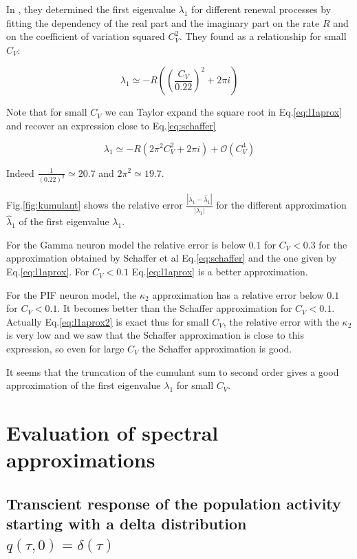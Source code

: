 \documentclass[12pt,twoside]{report}
\begin{document}
In \cite{SchOst13},  they determined the first eigenvalue $\lambda_1$ for different renewal processes by fitting the dependency of the real part and the imaginary part on the rate $R$ and on the coefficient of variation squared $C_V^2$. They found as a relationship for small $C_V$:

\begin{equation}
\label{eq:schaffer}
\lambda_1 \simeq -R\left( \left(\frac{C_V}{0.22}\right)^2+2\pi i\right) 
\end{equation}

Note that for small $C_V$ we can Taylor expand the square root in Eq.\eqref{eq:l1aprox} and recover an expression close to Eq.\eqref{eq:schaffer}

\begin{equation}
\label{eq:l1aprox2}
\lambda_1\simeq -R\left(2\pi^2 C_V^2+2\pi i\right) + \mathcal{O}(C_V^4)
\end{equation}

Indeed $\frac{1}{(0.22)^2}\simeq20.7$ and $2\pi^2\simeq19.7$.

Fig.\ref{fig:kumulant} shows the relative error $\frac{|\lambda_1 -\hat{\lambda}_1|}{|\lambda_1|}$ for the different approximation $\hat{\lambda}_1$ of the first eigenvalue $\lambda_1$. 

For the Gamma neuron model the relative error is below $0.1$ for $C_V<0.3$ for the approximation obtained by Schaffer et al Eq.\eqref{eq:schaffer} and the one given by Eq.\eqref{eq:l1aprox}. For $C_V<0.1$ Eq.\eqref{eq:l1aprox} is a better approximation. 

For the PIF neuron model, the $\kappa_2$ approximation has a relative error below $0.1$ for $C_V<0.1$. It becomes better than the Schaffer approximation for $C_V<0.1$. Actually Eq.\eqref{eq:l1aprox2} is exact thus for small $C_V$, the relative error with the $\kappa_2$ is very low and we saw that the Schaffer approximation is close to this expression, so even for large $C_V$ the Schaffer approximation is good.

 It seems that the truncation of the cumulant sum to second order gives a good approximation of the first eigenvalue $\lambda_1$ for small $C_V$.  %

\chapter{Evaluation of spectral approximations}
\label{chap:grene}

\section{Transcient response of the population activity starting with a delta distribution $q(\tau,0)=\delta(\tau)$}
\end{document}
